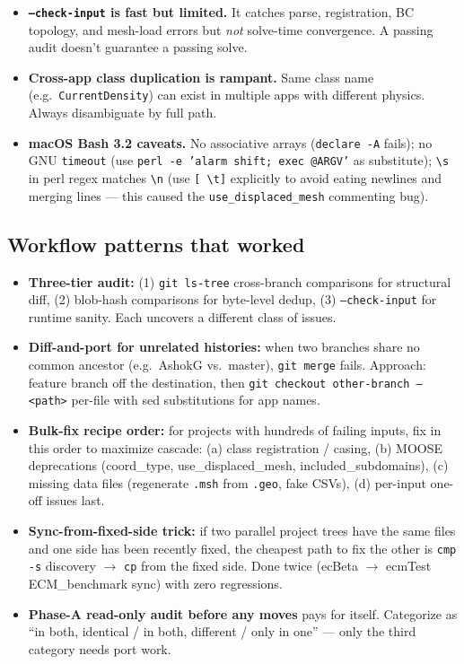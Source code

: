 \documentclass[11pt,letterpaper]{article}
\newenvironment{tightitemize}{\begin{itemize}\setlength\itemsep{0pt}\setlength\parsep{0pt}}{\end{itemize}}
\newcommand{\code}[1]{\texttt{\small #1}}
\begin{document}
\begin{tightitemize}
  \item \textbf{\code{--check-input} is fast but limited.} It catches parse, registration, BC topology, and mesh-load errors but \emph{not} solve-time convergence. A passing audit doesn't guarantee a passing solve.
  \item \textbf{Cross-app class duplication is rampant.} Same class name (e.g.\ \code{CurrentDensity}) can exist in multiple apps with different physics. Always disambiguate by full path.
  \item \textbf{macOS Bash 3.2 caveats.} No associative arrays (\code{declare -A} fails); no GNU \code{timeout} (use \code{perl -e 'alarm shift; exec @ARGV'} as substitute); \code{\textbackslash{}s} in perl regex matches \code{\textbackslash{}n} (use \code{[ \textbackslash{}t]} explicitly to avoid eating newlines and merging lines --- this caused the \code{use\_displaced\_mesh} commenting bug).
\end{tightitemize}

\subsection{Workflow patterns that worked}

\begin{tightitemize}
  \item \textbf{Three-tier audit:} (1) \code{git ls-tree} cross-branch comparisons for structural diff, (2) blob-hash comparisons for byte-level dedup, (3) \code{--check-input} for runtime sanity. Each uncovers a different class of issues.
  \item \textbf{Diff-and-port for unrelated histories:} when two branches share no common ancestor (e.g.\ AshokG vs.\ master), \code{git merge} fails. Approach: feature branch off the destination, then \code{git checkout other-branch -- <path>} per-file with sed substitutions for app names.
  \item \textbf{Bulk-fix recipe order:} for projects with hundreds of failing inputs, fix in this order to maximize cascade: (a) class registration / casing, (b) MOOSE deprecations (coord\_type, use\_displaced\_mesh, included\_subdomains), (c) missing data files (regenerate \code{.msh} from \code{.geo}, fake CSVs), (d) per-input one-off issues last.
  \item \textbf{Sync-from-fixed-side trick:} if two parallel project trees have the same files and one side has been recently fixed, the cheapest path to fix the other is \code{cmp -s} discovery $\to$ \code{cp} from the fixed side. Done twice (ecBeta $\to$ ecmTest ECM\_benchmark sync) with zero regressions.
  \item \textbf{Phase-A read-only audit before any moves} pays for itself. Categorize as ``in both, identical / in both, different / only in one'' --- only the third category needs port work.
\end{tightitemize}
\end{document}
